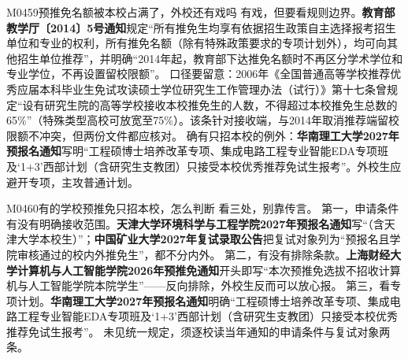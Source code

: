 \begin{qa}{M0459}{预推免名额被本校占满了，外校还有戏吗}
有戏，但要看规则边界。\textbf{教育部教学厅〔2014〕5号通知}规定“所有推免生均享有依据招生政策自主选择报考招生单位和专业的权利，所有推免名额（除有特殊政策要求的专项计划外），均可向其他招生单位推荐”，并明确“2014年起，教育部下达推免名额时不再区分学术学位和专业学位，不再设置留校限额”。
口径要留意：2006年《全国普通高等学校推荐优秀应届本科毕业生免试攻读硕士学位研究生工作管理办法（试行）》第十七条曾规定“设有研究生院的高等学校接收本校推免生的人数，不得超过本校推免生总数的65\%”（特殊类型高校可放宽至75\%）。该条针对接收端，与2014年取消推荐端留校限额不冲突，但两份文件都应核对。
确有只招本校的例外：\textbf{华南理工大学2027年预报名通知}写明“工程硕博士培养改革专项、集成电路工程专业智能EDA专项班及‘1+3’西部计划（含研究生支教团）只接受本校优秀推荐免试生报考”。外校生应避开专项，主攻普通计划。
\end{qa}

\begin{qa}{M0460}{有的学校预推免只招本校，怎么判断}
看三处，别靠传言。
第一，申请条件有没有明确接收范围。\textbf{天津大学环境科学与工程学院2027年预报名通知}写“（含天津大学本校生）”；\textbf{中国矿业大学2027年复试录取公告}把复试对象列为“预报名且学院审核通过的校内外推免生”，都不分内外。
第二，有没有排除条款。\textbf{上海财经大学计算机与人工智能学院2026年预推免通知}开头即写“本次预推免选拔不招收计算机与人工智能学院本院学生”——反向排除，外校生反而可以放心报。
第三，看专项计划。\textbf{华南理工大学2027年预报名通知}明确“工程硕博士培养改革专项、集成电路工程专业智能EDA专项班及‘1+3’西部计划（含研究生支教团）只接受本校优秀推荐免试生报考”。
未见统一规定，须逐校读当年通知的申请条件与复试对象两条。
\end{qa}

